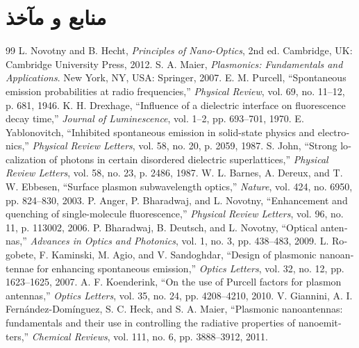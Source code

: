 \documentclass[12pt,a4paper]{report}
\begin{document}
\chapter*{منابع و مآخذ}
\begin{latin}
\renewcommand{\bibname}{\rl{منابع و مآخذ}}
\renewcommand{\chapter}[2]{}   %
\begin{thebibliography}{99}
 L. Novotny and B. Hecht, \textit{Principles of Nano-Optics}, 2nd ed. Cambridge, UK: Cambridge University Press, 2012.
 S. A. Maier, \textit{Plasmonics: Fundamentals and Applications}. New York, NY, USA: Springer, 2007.
 E. M. Purcell, ``Spontaneous emission probabilities at radio frequencies,'' \textit{Physical Review}, vol. 69, no. 11--12, p. 681, 1946.
 K. H. Drexhage, ``Influence of a dielectric interface on fluorescence decay time,'' \textit{Journal of Luminescence}, vol. 1--2, pp. 693--701, 1970.
 E. Yablonovitch, ``Inhibited spontaneous emission in solid-state physics and electronics,'' \textit{Physical Review Letters}, vol. 58, no. 20, p. 2059, 1987.
 S. John, ``Strong localization of photons in certain disordered dielectric superlattices,'' \textit{Physical Review Letters}, vol. 58, no. 23, p. 2486, 1987.
 W. L. Barnes, A. Dereux, and T. W. Ebbesen, ``Surface plasmon subwavelength optics,'' \textit{Nature}, vol. 424, no. 6950, pp. 824--830, 2003.
 P. Anger, P. Bharadwaj, and L. Novotny, ``Enhancement and quenching of single-molecule fluorescence,'' \textit{Physical Review Letters}, vol. 96, no. 11, p. 113002, 2006.
 P. Bharadwaj, B. Deutsch, and L. Novotny, ``Optical antennas,'' \textit{Advances in Optics and Photonics}, vol. 1, no. 3, pp. 438--483, 2009.
 L. Rogobete, F. Kaminski, M. Agio, and V. Sandoghdar, ``Design of plasmonic nanoantennae for enhancing spontaneous emission,'' \textit{Optics Letters}, vol. 32, no. 12, pp. 1623--1625, 2007.
 A. F. Koenderink, ``On the use of Purcell factors for plasmon antennas,'' \textit{Optics Letters}, vol. 35, no. 24, pp. 4208--4210, 2010.
 V. Giannini, A. I. Fern\'andez-Dom\'inguez, S. C. Heck, and S. A. Maier, ``Plasmonic nanoantennas: fundamentals and their use in controlling the radiative properties of nanoemitters,'' \textit{Chemical Reviews}, vol. 111, no. 6, pp. 3888--3912, 2011.

\end{thebibliography}
\end{latin}
\end{document}

